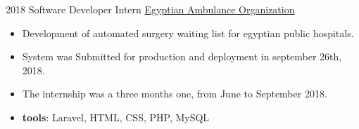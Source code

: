 \documentclass[letterpaper]{twentysecondcv} %
\begin{document}
\begin{twenty}
    \twentyitem
   		{2018}
		{}
        {Software Developer Intern}
        {\href{http://www.eao.gov.eg/English/Pages/default.aspx/}{Egyptian Ambulance Organization}}
        {}
        {\vspace{-2mm}\begin{itemize}[topsep=0pt,partopsep=0pt]
				\item  Development of automated surgery waiting list for egyptian public hospitals.
\item System was Submitted for production and deployment in september 26th, 2018.
\item The internship was a three months one, from June to September 2018.
				\item \textbf{tools}: Laravel, HTML, CSS, PHP, MySQL 
    \end{itemize}} \\
		

        
\end{twenty}
\end{document}

